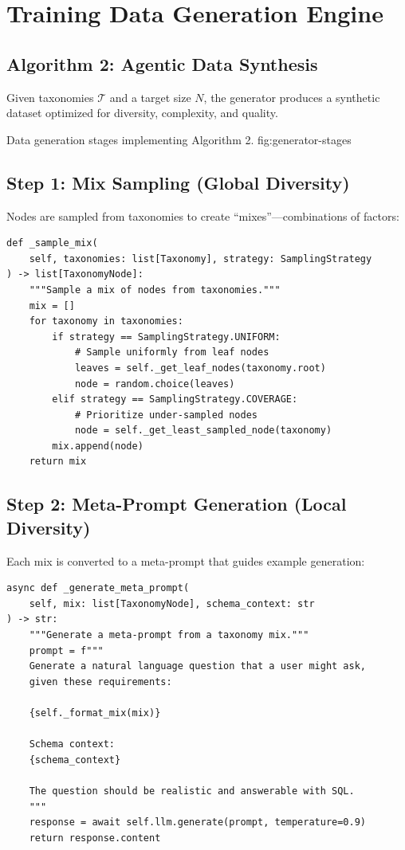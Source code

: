 \chapter{Training Data Generation Engine}
\label{chap:generator}\label{sim:chap:generator}

\section{Algorithm 2: Agentic Data Synthesis}

Given taxonomies $\mathcal{T}$ and a target size $N$, the generator produces a synthetic
dataset optimized for diversity, complexity, and quality.

%
  {Data generation stages implementing Algorithm 2.}%
  {fig:generator-stages}

\section{Step 1: Mix Sampling (Global Diversity)}

Nodes are sampled from taxonomies to create ``mixes''---combinations of factors:

\begin{lstlisting}[language=jsonx,caption={Mix sampling (simula\_data\_generator.py, lines 120--150)}]
def _sample_mix(
    self, taxonomies: list[Taxonomy], strategy: SamplingStrategy
) -> list[TaxonomyNode]:
    """Sample a mix of nodes from taxonomies."""
    mix = []
    for taxonomy in taxonomies:
        if strategy == SamplingStrategy.UNIFORM:
            # Sample uniformly from leaf nodes
            leaves = self._get_leaf_nodes(taxonomy.root)
            node = random.choice(leaves)
        elif strategy == SamplingStrategy.COVERAGE:
            # Prioritize under-sampled nodes
            node = self._get_least_sampled_node(taxonomy)
        mix.append(node)
    return mix
\end{lstlisting}

\section{Step 2: Meta-Prompt Generation (Local Diversity)}

Each mix is converted to a meta-prompt that guides example generation:

\begin{lstlisting}[language=jsonx,caption={Meta-prompt generation}]
async def _generate_meta_prompt(
    self, mix: list[TaxonomyNode], schema_context: str
) -> str:
    """Generate a meta-prompt from a taxonomy mix."""
    prompt = f"""
    Generate a natural language question that a user might ask,
    given these requirements:
    
    {self._format_mix(mix)}
    
    Schema context:
    {schema_context}
    
    The question should be realistic and answerable with SQL.
    """
    response = await self.llm.generate(prompt, temperature=0.9)
    return response.content
\end{lstlisting}

